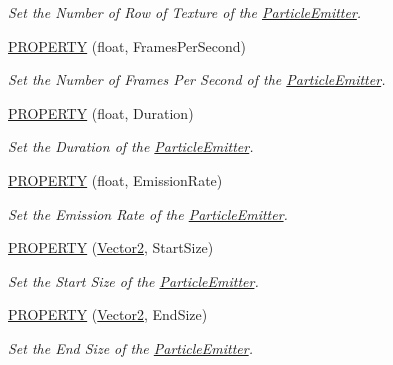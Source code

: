 \begin{DoxyCompactItemize}
\begin{DoxyCompactList}\small\item\em Set the Number of Row of Texture of the \hyperlink{class_i_dream_sky_1_1_particle_emitter}{Particle\+Emitter}. \end{DoxyCompactList}\item 
\hyperlink{class_i_dream_sky_1_1_particle_emitter_ac5a0983536193b2d6f5ef83ca1376f14}{P\+R\+O\+P\+E\+R\+TY} (float, Frames\+Per\+Second)
\begin{DoxyCompactList}\small\item\em Set the Number of Frames Per Second of the \hyperlink{class_i_dream_sky_1_1_particle_emitter}{Particle\+Emitter}. \end{DoxyCompactList}\item 
\hyperlink{class_i_dream_sky_1_1_particle_emitter_a4845e0c377a0c815a96ba82b459221aa}{P\+R\+O\+P\+E\+R\+TY} (float, Duration)
\begin{DoxyCompactList}\small\item\em Set the Duration of the \hyperlink{class_i_dream_sky_1_1_particle_emitter}{Particle\+Emitter}. \end{DoxyCompactList}\item 
\hyperlink{class_i_dream_sky_1_1_particle_emitter_a29adc6acac55c68f353f04a61b58ff14}{P\+R\+O\+P\+E\+R\+TY} (float, Emission\+Rate)
\begin{DoxyCompactList}\small\item\em Set the Emission Rate of the \hyperlink{class_i_dream_sky_1_1_particle_emitter}{Particle\+Emitter}. \end{DoxyCompactList}\item 
\hyperlink{class_i_dream_sky_1_1_particle_emitter_ad88108f904c5f5098fa639d15040e6e9}{P\+R\+O\+P\+E\+R\+TY} (\hyperlink{class_i_dream_sky_1_1_vector2}{Vector2}, Start\+Size)
\begin{DoxyCompactList}\small\item\em Set the Start Size of the \hyperlink{class_i_dream_sky_1_1_particle_emitter}{Particle\+Emitter}. \end{DoxyCompactList}\item 
\hyperlink{class_i_dream_sky_1_1_particle_emitter_a0924ca813e6fc2d7cce41dfbdba36831}{P\+R\+O\+P\+E\+R\+TY} (\hyperlink{class_i_dream_sky_1_1_vector2}{Vector2}, End\+Size)
\begin{DoxyCompactList}\small\item\em Set the End Size of the \hyperlink{class_i_dream_sky_1_1_particle_emitter}{Particle\+Emitter}. \end{DoxyCompactList}\item 

\end{DoxyCompactItemize}
